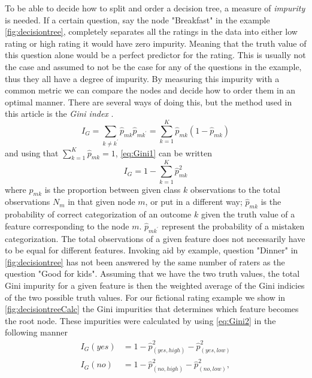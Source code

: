 To be able to decide how to split and order a decision tree, a measure of \textit{impurity} is needed. If a certain question, say the node "Breakfast" in the example \cref{fig:decisiontree}, completely separates all the ratings in the data into either low rating or high rating it would have zero impurity. Meaning that the truth value of this question alone would be a perfect predictor for the rating. This is usually not the case and assumed to not be the case for any of the questions in the example, thus they all have a degree of impurity. By measuring this impurity with a common metric we can compare the nodes and decide how to order them in an optimal manner.
There are several ways of doing this, but the method used in this article is the \textit{Gini index} \cite[p.~309]{statelem}.
\begin{equation}\label{eq:Gini1}
I_G = \sum_{k \neq k^{\prime}} \hat{p}_{m k} \hat{p}_{m k^{\prime}}=\sum_{k=1}^{K} \hat{p}_{m k}\left(1-\hat{p}_{m k}\right)
\end{equation}
and using that $\sum_{k=1}^{K} \hat{p}_{m k} = 1$, \cref{eq:Gini1} can be written 
\begin{equation}\label{eq:Gini2}
    I_G = 1 - \sum_{k=1}^{K} \hat{p}_{m k}^2
\end{equation}
where $\hat{p}_{m k}$ is the proportion between given class $k$ observations to the total observations $N_m$ in that given node $m$, or put in a different way; $\hat{p}_{m k}$ is the probability of correct categorization of an outcome $k$ given the truth value of a feature corresponding to the node $m$. $\hat{p}_{m k^{\prime}}$ represent the probability of a mistaken categorization. The total observations of a given feature does not necessarily have to be equal for different features. Invoking aid by example, question "Dinner" in \cref{fig:decisiontree} has not been answered by the same number of raters as the question "Good for kids".
Assuming that we have the two truth values, the total Gini impurity for a given feature is then the weighted average of the Gini indicies of the two possible truth values.
For our fictional rating example we show in \cref{fig:decisiontreeCalc} the Gini impurities that determines which feature becomes the root node. These impurities were calculated by using \cref{eq:Gini2} in the following manner
\begin{equation}
    \begin{aligned}
    I_G(yes) &= 1 - \hat{p}_{(yes,high)}^2 - \hat{p}_{(yes,low)}^2 \\
    I_G(no) &= 1 - \hat{p}_{(no,high)}^2 - \hat{p}_{(no, low)}^2,
    \end{aligned}
\end{equation}
